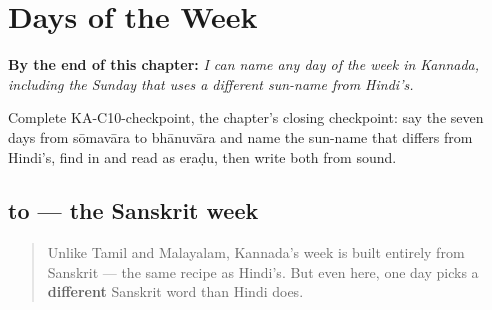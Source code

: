 
\chapter{Days of the Week}
\label{ch:ka-days-of-the-week}

\begin{chapteropening}
\textbf{By the end of this chapter:} \emph{I can name any day of the week in Kannada, including the Sunday that uses a different sun-name from Hindi's.}

Complete KA-C10-checkpoint, the chapter's closing checkpoint: say the seven days from sōmavāra to bhānuvāra and name the sun-name that differs from Hindi's, find  in  and read  as eraḍu, then write both from sound.
\end{chapteropening}

\section[\texorpdfstring{\kn{ಸೋಮವಾರ} \kn{ಮಂಗಳವಾರ} … (sōmavāra …)}{ಸೋಮವಾರ ಮಂಗಳವಾರ … (sōmavāra …)}]{ to  — the Sanskrit week}

\label{lesson:KA-C10-vaara}



\begin{quote}
Unlike Tamil and Malayalam, Kannada's week is built entirely from Sanskrit — the same recipe as Hindi's. But even here, one day picks a \textbf{different} Sanskrit word than Hindi does.
\end{quote}

